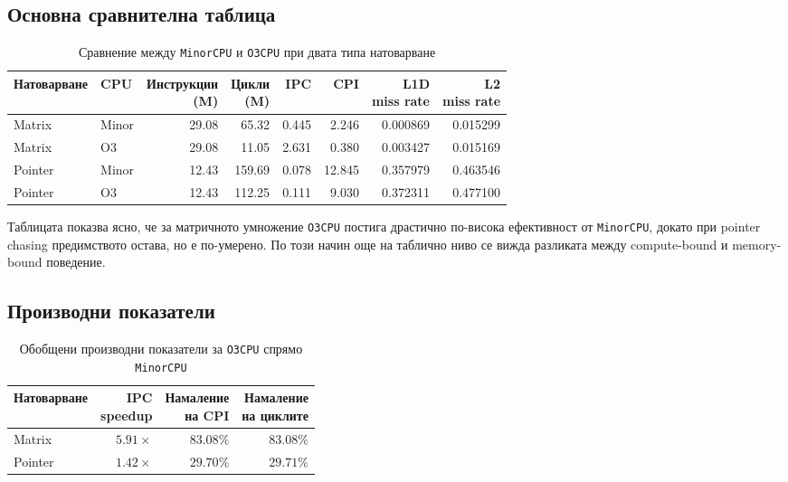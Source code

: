 \documentclass[12pt,a4paper]{article}
\begin{document}
\subsection{Основна сравнителна таблица}
\begin{table}[H]
    \centering
    \small
    \setlength{\tabcolsep}{5pt}
    \begin{tabular}{l l r r r r r r}
        \toprule
        Натоварване & CPU & \makecell[r]{Инструкции\\(M)} & \makecell[r]{Цикли\\(M)} & IPC & CPI & \makecell[r]{L1D\\miss rate} & \makecell[r]{L2\\miss rate} \\
        \midrule
        Matrix & Minor & 29.08 & 65.32 & 0.445 & 2.246 & 0.000869 & 0.015299 \\
        Matrix & O3 & 29.08 & 11.05 & 2.631 & 0.380 & 0.003427 & 0.015169 \\
        Pointer & Minor & 12.43 & 159.69 & 0.078 & 12.845 & 0.357979 & 0.463546 \\
        Pointer & O3 & 12.43 & 112.25 & 0.111 & 9.030 & 0.372311 & 0.477100 \\
        \bottomrule
    \end{tabular}
    \caption{Сравнение между \texttt{MinorCPU} и \texttt{O3CPU} при двата типа натоварване}
\end{table}

Таблицата показва ясно, че за матричното умножение \texttt{O3CPU} постига драстично по-висока ефективност от \texttt{MinorCPU}, докато при pointer chasing предимството остава, но е по-умерено. По този начин още на таблично ниво се вижда разликата между compute-bound и memory-bound поведение.

\subsection{Производни показатели}
\begin{table}[H]
    \centering
    \small
    \setlength{\tabcolsep}{6pt}
    \begin{tabular}{l r r r}
        \toprule
        Натоварване & \makecell[r]{IPC\\speedup} & \makecell[r]{Намаление\\на CPI} & \makecell[r]{Намаление\\на циклите} \\
        \midrule
        Matrix & \(5.91\times\) & \(83.08\%\) & \(83.08\%\) \\
        Pointer & \(1.42\times\) & \(29.70\%\) & \(29.71\%\) \\
        \bottomrule
    \end{tabular}
    \caption{Обобщени производни показатели за \texttt{O3CPU} спрямо \texttt{MinorCPU}}
\end{table}
\end{document}
